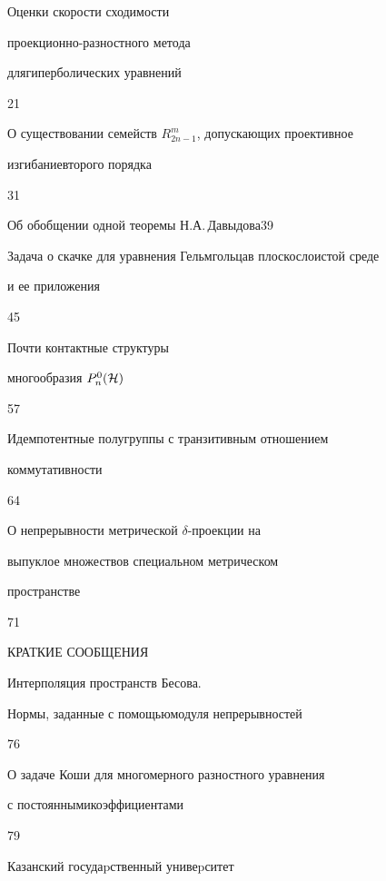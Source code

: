 

{Оценки скорости сходимости


проекционно-разностного метода


для\newline гиперболических уравнений}{21}




{О существовании семейств $R^m_{2n-1}$, допускающих проективное 


изгибание\newline второго порядка}{31}




{Об обобщении одной теоремы Н.А.\,Давыдова}{39}




{Задача о скачке для уравнения Гельмгольца\newline в плоскослоистой среде


и ее приложения}{45}




{Почти контактные структуры


многообразия $P^0_n(\cal H)$}{57}




{Идемпотентные полугруппы с транзитивным отношением


коммутативности}{64}




{О непрерывности метрической $\delta$-проекции на 


выпуклое множество\newline в специальном метрическом


пространстве}{71}








\bigskip


\par





\centerline{КРАТКИЕ СООБЩЕНИЯ}


\bigskip







{Интерполяция пространств Бесова.


Нормы, заданные с помощью\newline модуля непрерывностей}{76}




{О задаче Коши для многомерного разностного уравнения


с постоянными\newline коэффициентами}{79}


\bigskip













\vfill


\noindent\raisebox{2pt}{\copyright} Казанский госудаpственный унивеpситет





